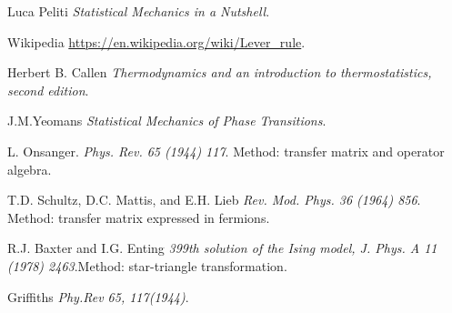 
\cleardoublepage
{}
\begin{thebibliography}{99}


Luca Peliti
\textit{Statistical Mechanics in a Nutshell}.

Wikipedia 
\url{https://en.wikipedia.org/wiki/Lever_rule}.

Herbert B. Callen
\textit{Thermodynamics and an introduction to thermostatistics, second edition}.

J.M.Yeomans
\textit{Statistical Mechanics of Phase Transitions}.

L. Onsanger.
\textit{Phys. Rev. 65 (1944) 117}. Method: transfer matrix and operator algebra.

T.D. Schultz, D.C. Mattis, and E.H. Lieb
\textit{Rev. Mod. Phys. 36 (1964) 856}. Method: transfer matrix expressed in fermions.


R.J. Baxter and I.G. Enting
\textit{399th solution of the Ising model, J. Phys. A 11 (1978) 2463}.Method: star-triangle transformation. 


Griffiths
\textit{Phy.Rev 65, 117(1944)}. 

 

%

\end{thebibliography}